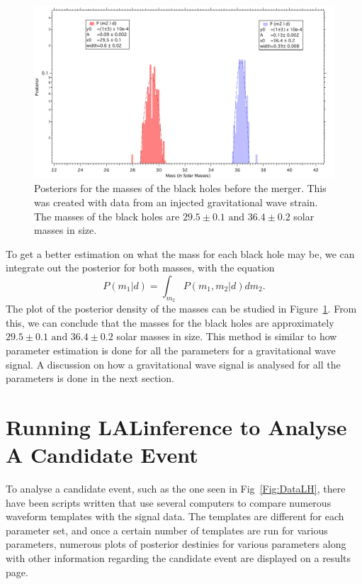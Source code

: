 \documentclass{article}
\begin{document}
     \begin{figure}[h]
     	\centering
     	\includegraphics[width=1\textwidth]{Figures/MassPost.pdf} 
     	\caption{Posteriors for the masses of the black holes before the  merger. This was created with data from an injected gravitational wave strain. The masses  of the black holes are $29.5\pm0.1 \text{ and } 36.4\pm0.2$ solar masses in size.}
     	\label{Fig:1Dmasses}
     \end{figure}
 
 
 To get a better estimation on what the mass for each black hole may be, we can integrate out the posterior for both masses, with the equation $$P(m_1|d)= \int_{m_2} {P(m_1, m_2 | d) dm_2}.$$ The plot of the posterior density of the masses can be studied in Figure~\ref{Fig:1Dmasses}. From this, we can conclude that the masses for the black holes are approximately $29.5\pm0.1 \text{ and } 36.4\pm0.2$ solar masses in size. This method is similar to how parameter estimation is done for all the parameters for a gravitational wave signal. A discussion on how a gravitational wave signal is analysed for all the parameters is done in the next section.\\
 
 
 \section{Running LALinference to Analyse A Candidate Event}
 
 To analyse a candidate event, such as the one seen in Fig~\ref{Fig:DataLH}, there have been scripts written that use several computers to compare numerous waveform templates with the signal data. The templates are different for each parameter set, and once a certain number of templates are run for various parameters, numerous plots of posterior destinies for various parameters along with other information regarding the candidate event are displayed on a results page. \\
 
\end{document}
